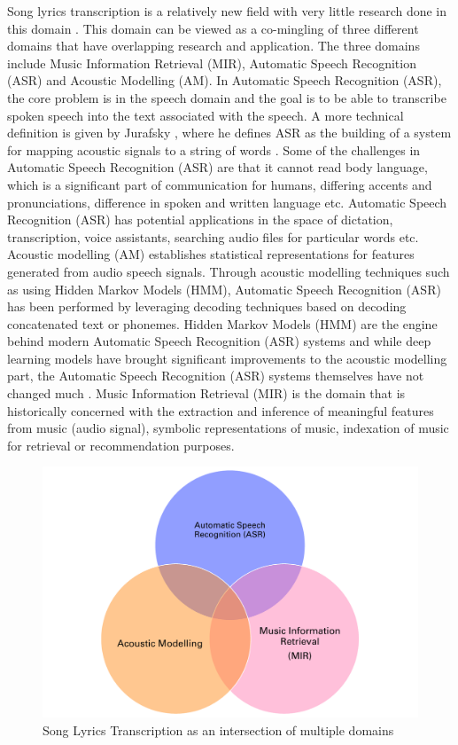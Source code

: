 Song lyrics transcription is a relatively new field with very little research done in this domain \cite{gao2022automatic}. This domain can be viewed as a co-mingling of three different domains that have overlapping research and application. The three domains include Music Information Retrieval (MIR), Automatic Speech Recognition (ASR) and Acoustic Modelling (AM). In Automatic Speech Recognition (ASR), the core problem is in the speech domain and the goal is to be able to transcribe spoken speech into the text associated with the speech. A more technical definition is given by Jurafsky \cite{jurafsky2000speech} , where he defines ASR as the building of a system for mapping acoustic signals to a string of words \cite{jurafsky2000speech} . Some of the challenges in Automatic Speech Recognition (ASR)  \cite{forsberg2003speech} are that it cannot read body language, which is a significant part of communication for humans, differing accents and pronunciations, difference in spoken and written language etc. Automatic Speech Recognition (ASR) has potential applications in the space of dictation, transcription, voice assistants, searching audio files for particular words etc. Acoustic modelling (AM) establishes statistical representations for features generated from audio speech signals\cite{karpagavalli2016review}. Through acoustic modelling techniques such as using Hidden Markov Models (HMM), Automatic Speech Recognition (ASR) has been performed by leveraging decoding techniques based on decoding concatenated text or phonemes. Hidden Markov Models (HMM) are the engine behind modern Automatic Speech Recognition (ASR) systems and while deep learning models have brought significant improvements to the acoustic modelling part, the Automatic Speech Recognition (ASR) systems themselves have not changed much \cite{gales2008application}. Music Information Retrieval (MIR) is the domain that is historically concerned with the extraction and inference of meaningful features from music (audio signal), symbolic representations of music, indexation of music for retrieval or recommendation purposes.


\begin{figure}[H]
    \centering
    \includegraphics[width=\textwidth]{01-introduction/figures/between_three_domains.pdf}
    \caption{Song Lyrics Transcription as an intersection of multiple domains}%
    \label{fig:setup1}
\end{figure}

